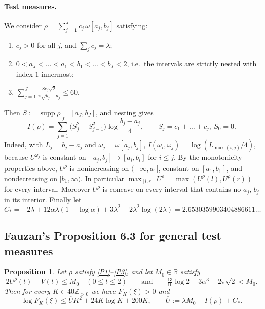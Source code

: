 \documentclass[11pt]{article}
\newtheorem{proposition}{Proposition}
\theoremstyle{remark}
\newcommand{\Z}{\mathbb{Z}}
\newcommand{\R}{\mathbb{R}}
\newcommand{\Ubar}{\overline{U}}
\newcommand{\Cstar}{C_{*}}
\DeclareMathOperator{\supp}{supp}
\begin{document}
\paragraph{Test measures.} We consider $\rho=\sum_{j=1}^Jc_j\,\omega[a_j,b_j]$ satisfying:
\begin{enumerate}[label=(P\arabic*),leftmargin=3.2em]
\item\label{P1} $c_j>0$ for all $j$, and $\sum_jc_j=\lambda$;
\item\label{P2} $0<a_J<\dots<a_1<b_1<\dots<b_J<2$, i.e.\ the intervals are strictly nested with index $1$ innermost;
\item\label{P3} $\displaystyle\sum_{j=1}^J\frac{8c_j\sqrt2}{\pi\sqrt{b_j-a_j}}\le60$.
\end{enumerate}
Then $S:=\supp\rho=[a_J,b_J]$, and nesting gives~\cite[(A.2)]{F}
\begin{equation}\label{eq:energy}
I(\rho)=\sum_{j=1}^J\bigl(S_j^2-S_{j-1}^2\bigr)\log\frac{b_j-a_j}{4},\qquad S_j=c_1+\dots+c_j,\ S_0=0 .
\end{equation}
Indeed, with $L_j=b_j-a_j$ and $\omega_j=\omega[a_j,b_j]$, $I(\omega_i,\omega_j)=\log(L_{\max(i,j)}/4)$, because $U^{\omega_j}$ is constant on $[a_j,b_j]\supset[a_i,b_i]$ for $i\le j$. By the monotonicity properties above, $U^\rho$ is nonincreasing on $(-\infty,a_1]$, constant on $[a_1,b_1]$, and nondecreasing on $[b_1,\infty)$. In particular $\max_{[l,r]}U^\rho=\max(U^\rho(l),U^\rho(r))$ for every interval. Moreover $U^\rho$ is concave on every interval that contains no $a_j$, $b_j$ in its interior. Finally let~\cite[(6.3)]{F}
\[
\Cstar=-2\lambda+12\alpha\lambda(1-\log\alpha)+3\lambda^2-2\lambda^2\log(2\lambda)=2.6530359903404886611\ldots
\]

\subsection{Fauzan's Proposition 6.3 for general test measures}

\begin{proposition}\label{prop:63}
Let $\rho$ satisfy \ref{P1}--\ref{P3}, and let $M_0\in\R$ satisfy
\begin{equation}\label{eq:M0hyp}
2U^\rho(t)-V(t)\le M_0\quad(0\le t\le2)\qquad\text{and}\qquad\tfrac{13}{10}\log2+3\alpha^3-2\pi\sqrt2<M_0 .
\end{equation}
Then for every $K\in40\Z_{>0}$ we have $F_K(\xi)>0$ and
\[
\log F_K(\xi)\le\Ubar K^2+24K\log K+200K,\qquad\Ubar:=\lambda M_0-I(\rho)+\Cstar .
\]
\end{proposition}
\end{document}
